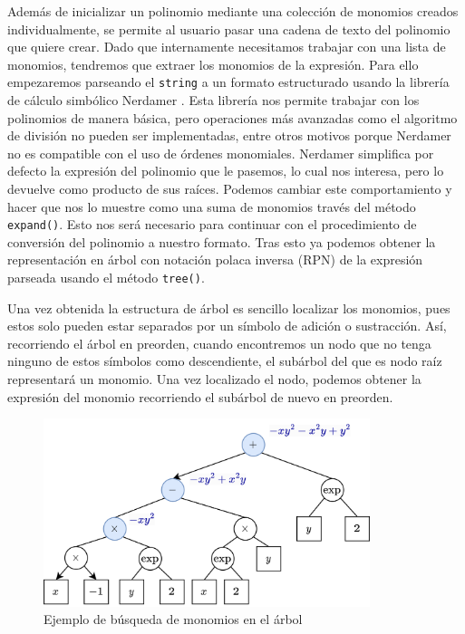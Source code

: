 Además de inicializar un polinomio mediante una colección de monomios creados individualmente, se permite al usuario pasar una cadena de texto del polinomio que quiere crear. Dado que internamente necesitamos trabajar con una lista de monomios, tendremos que extraer los monomios de la expresión. Para ello empezaremos parseando el \texttt{string} a un formato estructurado usando la librería de cálculo simbólico Nerdamer \cite{nerdamer}. Esta librería nos permite trabajar con los polinomios de manera básica, pero operaciones más avanzadas como el algoritmo de división no pueden ser implementadas, entre otros motivos porque Nerdamer no es compatible con el uso de órdenes monomiales. Nerdamer simplifica por defecto la expresión del polinomio que le pasemos, lo cual nos interesa, pero lo devuelve como producto de sus raíces. Podemos cambiar este comportamiento y hacer que nos lo muestre como una suma de monomios través del método \texttt{expand()}. Esto nos será necesario para continuar con el procedimiento de conversión del polinomio a nuestro formato. Tras esto ya podemos obtener la representación en árbol con notación polaca inversa (RPN) de la expresión parseada usando el método \texttt{tree()}.\newline

Una vez obtenida la estructura de árbol es sencillo localizar los monomios, pues estos solo pueden estar separados por un símbolo de adición o sustracción. Así, recorriendo el árbol en preorden, cuando encontremos un nodo que no tenga ninguno de estos símbolos como descendiente, el subárbol del que es nodo raíz representará un monomio. Una vez localizado el nodo, podemos obtener la expresión del monomio recorriendo el subárbol de nuevo en preorden.\newline
\begin{figure}[ht!]
    \centering
    \includegraphics[width=0.85\textwidth]{Plantilla-TFG-master/img/busquedaMon.png}
    \caption{Ejemplo de búsqueda de monomios en el árbol}
    \label{fig:busquedaMonom}
\end{figure}

